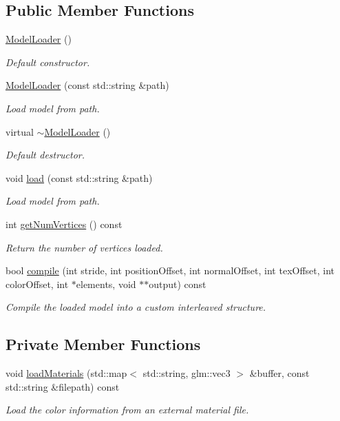 \subsection*{Public Member Functions}
\begin{DoxyCompactItemize}
\item 
\hyperlink{class_model_loader_a5892e5788d106f1e57124a73cdb2ddb5}{Model\+Loader} ()
\begin{DoxyCompactList}\small\item\em Default constructor. \end{DoxyCompactList}\item 
\hyperlink{class_model_loader_a7bcce27e8a2d6aa701c3ec3f8e1fbd8a}{Model\+Loader} (const std\+::string \&path)
\begin{DoxyCompactList}\small\item\em Load model from path. \end{DoxyCompactList}\item 
virtual \hyperlink{class_model_loader_a4015291af96be2ea657577bdf4fb29f4}{$\sim$\+Model\+Loader} ()
\begin{DoxyCompactList}\small\item\em Default destructor. \end{DoxyCompactList}\item 
void \hyperlink{class_model_loader_a865094ab1e7314bee70da29ce86073ca}{load} (const std\+::string \&path)
\begin{DoxyCompactList}\small\item\em Load model from path. \end{DoxyCompactList}\item 
int \hyperlink{class_model_loader_aba7cba73fbff78ec25a218c102ed1822}{get\+Num\+Vertices} () const 
\begin{DoxyCompactList}\small\item\em Return the number of vertices loaded. \end{DoxyCompactList}\item 
bool \hyperlink{class_model_loader_a59aad7ebbcddd1a5bbfed8d2835d4043}{compile} (int stride, int position\+Offset, int normal\+Offset, int tex\+Offset, int color\+Offset, int $\ast$elements, void $\ast$$\ast$output) const 
\begin{DoxyCompactList}\small\item\em Compile the loaded model into a custom interleaved structure. \end{DoxyCompactList}\end{DoxyCompactItemize}
\subsection*{Private Member Functions}
\begin{DoxyCompactItemize}
\item 
void \hyperlink{class_model_loader_a1df1d3b0fae85b6c1d4cd9bdf07ec780}{load\+Materials} (std\+::map$<$ std\+::string, glm\+::vec3 $>$ \&buffer, const std\+::string \&filepath) const 
\begin{DoxyCompactList}\small\item\em Load the color information from an external material file. \end{DoxyCompactList}\end{DoxyCompactItemize}
